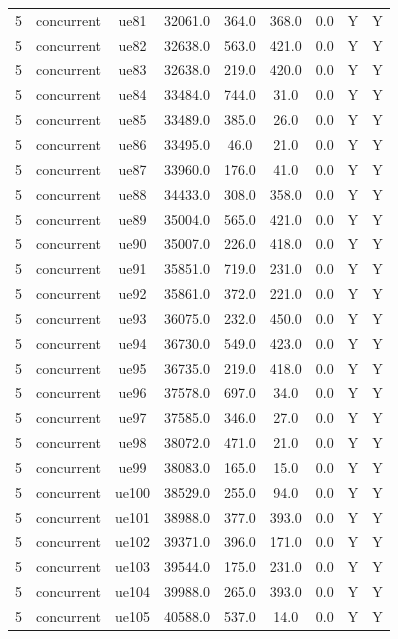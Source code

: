 \begin{table}[ht]
\begin{tabular}{|c|c|c|c|c|c|c|c|c|}
5 & concurrent & ue81 & 32061.0 & 364.0 & 368.0 & 0.0 & Y & Y \\
5 & concurrent & ue82 & 32638.0 & 563.0 & 421.0 & 0.0 & Y & Y \\
5 & concurrent & ue83 & 32638.0 & 219.0 & 420.0 & 0.0 & Y & Y \\
5 & concurrent & ue84 & 33484.0 & 744.0 & 31.0 & 0.0 & Y & Y \\
5 & concurrent & ue85 & 33489.0 & 385.0 & 26.0 & 0.0 & Y & Y \\
5 & concurrent & ue86 & 33495.0 & 46.0 & 21.0 & 0.0 & Y & Y \\
5 & concurrent & ue87 & 33960.0 & 176.0 & 41.0 & 0.0 & Y & Y \\
5 & concurrent & ue88 & 34433.0 & 308.0 & 358.0 & 0.0 & Y & Y \\
5 & concurrent & ue89 & 35004.0 & 565.0 & 421.0 & 0.0 & Y & Y \\
5 & concurrent & ue90 & 35007.0 & 226.0 & 418.0 & 0.0 & Y & Y \\
5 & concurrent & ue91 & 35851.0 & 719.0 & 231.0 & 0.0 & Y & Y \\
5 & concurrent & ue92 & 35861.0 & 372.0 & 221.0 & 0.0 & Y & Y \\
5 & concurrent & ue93 & 36075.0 & 232.0 & 450.0 & 0.0 & Y & Y \\
5 & concurrent & ue94 & 36730.0 & 549.0 & 423.0 & 0.0 & Y & Y \\
5 & concurrent & ue95 & 36735.0 & 219.0 & 418.0 & 0.0 & Y & Y \\
5 & concurrent & ue96 & 37578.0 & 697.0 & 34.0 & 0.0 & Y & Y \\
5 & concurrent & ue97 & 37585.0 & 346.0 & 27.0 & 0.0 & Y & Y \\
5 & concurrent & ue98 & 38072.0 & 471.0 & 21.0 & 0.0 & Y & Y \\
5 & concurrent & ue99 & 38083.0 & 165.0 & 15.0 & 0.0 & Y & Y \\
5 & concurrent & ue100 & 38529.0 & 255.0 & 94.0 & 0.0 & Y & Y \\
5 & concurrent & ue101 & 38988.0 & 377.0 & 393.0 & 0.0 & Y & Y \\
5 & concurrent & ue102 & 39371.0 & 396.0 & 171.0 & 0.0 & Y & Y \\
5 & concurrent & ue103 & 39544.0 & 175.0 & 231.0 & 0.0 & Y & Y \\
5 & concurrent & ue104 & 39988.0 & 265.0 & 393.0 & 0.0 & Y & Y \\
5 & concurrent & ue105 & 40588.0 & 537.0 & 14.0 & 0.0 & Y & Y \\

\end{tabular}
\end{table}
